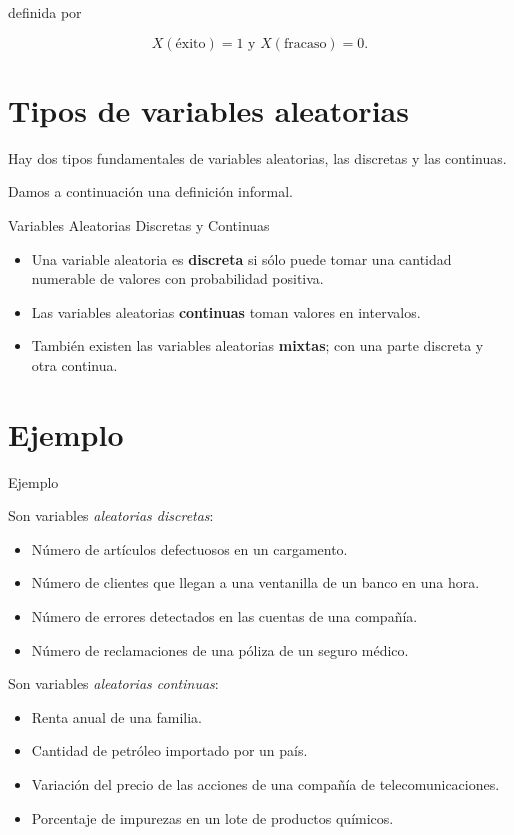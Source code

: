 \documentclass[
  letterpaper,
  DIV=11,
  numbers=noendperiod]{scrreprt}
\providecommand{\tightlist}{%
  \setlength{\itemsep}{0pt}\setlength{\parskip}{0pt}}\usepackage{longtable,booktabs,array}
\begin{document}
definida por

\[X(\mbox{éxito})=1 \mbox{ y } X(\mbox{fracaso})=0.\]

\section{Tipos de variables
aleatorias}\label{tipos-de-variables-aleatorias}

Hay dos tipos fundamentales de variables aleatorias, las discretas y las
continuas.

Damos a continuación una definición informal.

Variables Aleatorias Discretas y Continuas

\begin{itemize}
\tightlist
\item
  Una variable aleatoria es \textbf{discreta} si sólo puede tomar una
  cantidad numerable de valores con probabilidad positiva.
\item
  Las variables aleatorias \textbf{continuas} toman valores en
  intervalos.
\item
  También existen las variables aleatorias \textbf{mixtas}; con una
  parte discreta y otra continua.
\end{itemize}

\section{Ejemplo}\label{ejemplo}

Ejemplo

Son variables \emph{aleatorias discretas}:

\begin{itemize}
\tightlist
\item
  Número de artículos defectuosos en un cargamento.
\item
  Número de clientes que llegan a una ventanilla de un banco en una
  hora.
\item
  Número de errores detectados en las cuentas de una compañía.
\item
  Número de reclamaciones de una póliza de un seguro médico.
\end{itemize}

Son variables \emph{aleatorias continuas}:

\begin{itemize}
\tightlist
\item
  Renta anual de una familia.
\item
  Cantidad de petróleo importado por un país.
\item
  Variación del precio de las acciones de una compañía de
  telecomunicaciones.
\item
  Porcentaje de impurezas en un lote de productos químicos.
\end{itemize}
\end{document}
